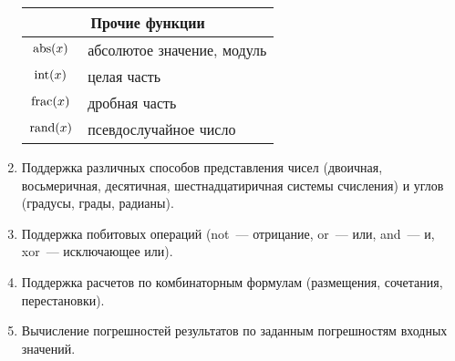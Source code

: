 \begin{enumerate}
\begin{table}
\begin{tabular}{|c|l|}
 \multicolumn{2}{|c|}{Прочие функции} 
 \\ \hline  
 $\operatorname{abs}(x)$  & абсолютое значение, модуль
 \\ \hline
 $\operatorname{int}(x)$  & целая часть
 \\ \hline
 $\operatorname{frac}(x)$ & дробная часть
 \\ \hline
 $\operatorname{rand}(x)$ & псевдослучайное число
 \\ \hline
\end{tabular}
\end{table}

  \item Поддержка различных способов представления чисел (двоичная,
        восьмеричная, десятичная, шестнадцатиричная системы счисления)
        и углов (градусы, грады, радианы).

  \item Поддержка побитовых операций (not~--- отрицание, 
        or~--- или, and~--- и, xor~--- исключающее или).

  \item Поддержка расчетов по комбинаторным формулам (размещения, сочетания,
        перестановки).

  \item Вычисление погрешностей результатов по заданным погрешностям входных
        значений.
\end{enumerate}


